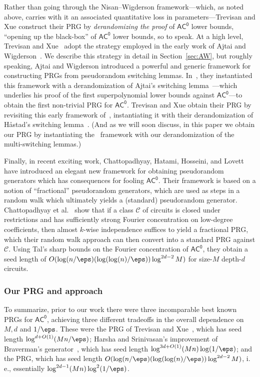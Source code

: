 \documentclass[11pt]{article}
\numberwithin{equation}{section}
\theoremstyle{definition}
\theoremstyle{plain}
\newcommand{\ie}{i.\,e.}
\theoremstyle{plain}
\newcommand{\acz}{\mathsf{AC^0}}
\begin{document}
Rather than going through the Nisan--Wigderson framework---which, as noted above, carries with it an associated quantitative loss in parameters---Trevisan and Xue construct their PRG by \emph{derandomizing the proof} of $\acz$ lower bounds, ``opening up the black-box'' of $\acz$ lower bounds, so to speak.  At a high level, Trevisan and Xue~\cite{TX13} adopt the strategy employed in the early work of Ajtai and Wigderson~\cite{AjtaiWigderson:85}. We describe this strategy in detail in Section~\ref{sec:AW}, but roughly speaking, Ajtai and Wigderson introduced a powerful and generic framework for constructing PRGs from pseudorandom switching lemmas. In~\cite{AjtaiWigderson:85}, they instantiated this framework with a derandomization of Ajtai's switching lemma~\cite{ajtai1983}---which underlies his proof of the first superpolynomial lower bounds against $\acz$---to obtain the first non-trivial PRG for $\acz$.  Trevisan and Xue obtain their PRG by revisiting this early framework of~\cite{AjtaiWigderson:85}, instantiating it with their derandomization of H{\aa}stad's switching lemma~\cite{Hastad86}. (And as we will soon discuss, in this
%
paper   %
we obtain our PRG by instantiating the~\cite{AjtaiWigderson:85} framework with our derandomization of the~\cite{Has14} multi-switching lemmas.)
 

 \medskip

Finally, in recent exciting work, %
 Chattopadhyay, Hatami, Hosseini, and Lovett~\cite{CHHL18journal} have
 introduced an elegant new framework for obtaining pseudorandom generators which has consequences for 
fooling $\acz$.  Their framework is based on a notion of ``fractional'' pseudorandom generators, which are used as steps in a random walk which ultimately yields a (standard) pseudorandom generator.  Chattopadhyay et al.~\cite{CHHL18journal} show that if a class
$\mathscr{C}$ %
of %
circuits %
is closed under restrictions and has sufficiently strong Fourier concentration on low-degree coefficients, then almost $k$-wise independence %
suffices  %
to yield a fractional PRG, which their random walk approach can then convert into a standard PRG against $\mathscr{C}$. Using Tal's sharp bounds \cite{Tal:15tightbounds} on the Fourier concentration of $\acz$, they obtain a seed length of $O(\log(n/\eps)(\log(\log(n)/\eps))\log^{2d-2} M)$ for size-$M$ depth-$d$ circuits.



\subsubsection{Our PRG and approach} 
To summarize, prior to our work there were three incomparable best known PRGs for $\acz$, achieving three different tradeoffs in the overall dependence on $M,d$ and $1/\eps$.  These were the PRG of Trevisan and Xue~\cite{TX13}, which has seed length $\log^{d+O(1)}(Mn/\eps)$; Harsha and Srinivasan's improvement of Braverman's generator~\cite{HS16journal}, which has seed length $\log^{3d+O(1)}(Mn)\log(1/\eps)$; and the \cite{CHHL18journal} PRG, which has seed length 
$O(\log(n/\eps)(\log(\log(n)/\eps))\log^{2d-2} M)$, \ie, essentially
$\log^{2d-1}(Mn)\log^2(1/\eps)$.
\end{document}
